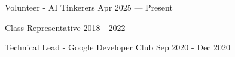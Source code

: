 Volunteer - AI Tinkerers	\hfill Apr 2025 --- Present
 
Class Representative	\hfill 2018 - 2022

Technical Lead -  Google Developer Club	\hfill Sep 2020 - Dec 2020


